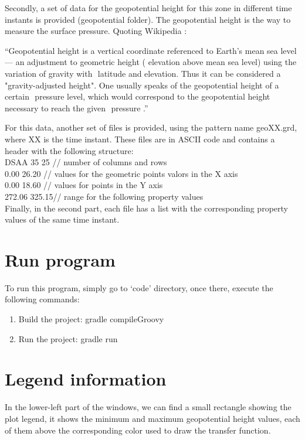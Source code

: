 \documentclass{article}
\begin{document}
Secondly, a set of data for the geopotential height for this zone in different time instants is provided (geopotential folder). The geopotential height is the way to measure the surface pressure. Quoting Wikipedia :

\indent ``Geopotential height is a vertical coordinate referenced to Earth's ​ mean sea level — an adjustment to geometric height (​ elevation above mean sea level) using the variation of gravity with ​ latitude and elevation. Thus it can be considered a "gravity-adjusted height". One usually speaks of the geopotential height of a certain ​ pressure level​, which would correspond to the geopotential height necessary to reach the given ​ pressure​ .''

For this data, another set of files is provided, using the pattern name geoXX.grd, where XX is the time instant. These files are in ASCII code and contains a header with the following structure:\\

\noindent DSAA 35 25 // number of columns and rows\\
0.00 26.20 // values for the geometric points valors in the X axis\\
0.00 18.60 // values for points in the Y axis\\
272.06 325.15// range for the following property values\\

Finally, in the second part, each file has a list with the corresponding property values of the same time instant.

\section{Run program}
To run this program, simply go to `code' directory, once there, execute the following commands:
\begin{enumerate}
  \item Build the project:
      gradle compileGroovy
  \item Run the project:
      gradle run
\end{enumerate}

\section{Legend information}
In the lower-left part of the windows, we can find a small rectangle showing the plot legend, it shows the minimum and maximum geopotential height values, each of them above the corresponding color used to draw the transfer function.
\end{document}
